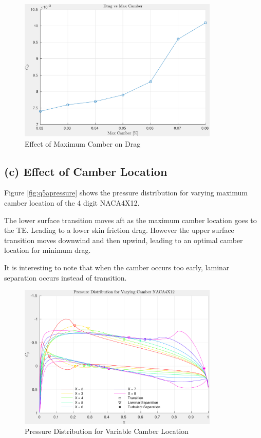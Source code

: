 \documentclass[letterpaper,12pt,]{article}
\begin{document}
\begin{figure}[!h]
    \centering
    \includegraphics[width = 0.85\textwidth]{./figures/q5dmaxcam.pdf}
    \caption{Effect of Maximum Camber on Drag}
    \label{fig:q5bdrag}
\end{figure}
\clearpage
\subsection*{(c) Effect of Camber Location}
Figure \ref{fig:q5apressure} shows the pressure distribution for varying maximum camber location of the 4 digit NACA4X12.

The lower surface transition moves aft as the maximum camber location goes to the TE. Leading to a lower skin friction drag. However the upper surface transition moves downwind and then upwind, leading to an optimal camber location for minimum drag.

It is interesting to note that when the camber occurs too early, laminar separation occurs instead of transition.
\begin{figure}[!h]
    \centering
    \includegraphics[width = 0.85\textwidth]{./figures/q5cpressure.pdf}
    \caption{Pressure Distribution for Variable Camber Location}
    \label{fig:q5cpressure}
\end{figure}
\end{document}

